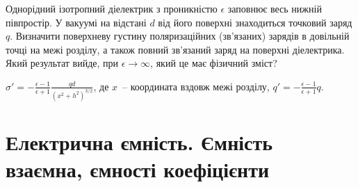 
\begin{problem}
Однорідний ізотропний діелектрик з проникністю $\epsilon$ заповнює весь нижній півпростір. У вакуумі на відстані $d$ від його поверхні знаходиться точковий заряд $q$. Визначити поверхневу густину поляризаційних (зв'язаних) зарядів в довільній точці на межі розділу, а також повний зв'язаний заряд на поверхні діелектрика. Який результат вийде, при $\epsilon\to\infty$, який це має фізичний зміст?
\begin{solution}
	$\sigma' = - \frac{\epsilon - 1}{\epsilon + 1} \frac{qd}{(x^2  +h^2)^{3/2}}$, де $x$~-- координата вздовж межі розділу, $q' = - \frac{\epsilon - 1}{\epsilon + 1}q$.
\end{solution}
\end{problem}

\section{Електрична ємність. Ємність взаємна, ємності коефіцієнти}

